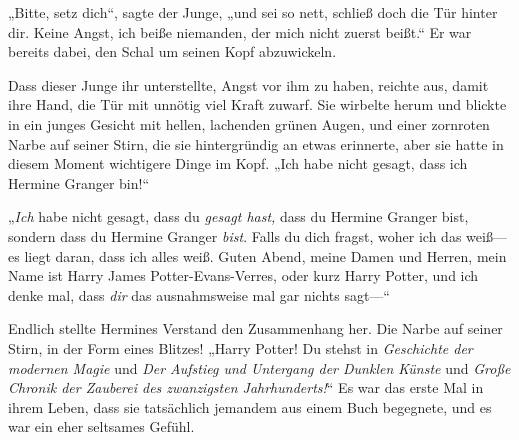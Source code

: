 „Bitte, setz dich“, sagte der Junge, „und sei so nett, schließ doch die Tür hinter dir. Keine Angst, ich beiße niemanden, der mich nicht zuerst beißt.“ Er war bereits dabei, den Schal um seinen Kopf abzuwickeln.

Dass dieser Junge ihr unterstellte, Angst vor ihm zu haben, reichte aus, damit ihre Hand, die Tür mit unnötig viel Kraft zuwarf. Sie wirbelte herum und blickte in ein junges Gesicht mit hellen, lachenden grünen Augen, und einer zornroten Narbe auf seiner Stirn, die sie hintergründig an etwas erinnerte, aber sie hatte in diesem Moment wichtigere Dinge im Kopf. „Ich habe nicht gesagt, dass ich Hermine Granger bin!“

„\emph{Ich} habe nicht gesagt, dass du \emph{gesagt hast,} dass du Hermine Granger bist, sondern dass du Hermine Granger \emph{bist}. Falls du dich fragst, woher ich das weiß—es liegt daran, dass ich alles weiß. Guten Abend, meine Damen und Herren, mein Name ist Harry James Potter-Evans-Verres, oder kurz Harry Potter, und ich denke mal, dass \emph{dir} das ausnahmsweise mal gar nichts sagt—“

Endlich stellte Hermines Verstand den Zusammenhang her. Die Narbe auf seiner Stirn, in der Form eines Blitzes! „Harry Potter! Du stehst in \emph{Geschichte der modernen Magie} und \emph{Der Aufstieg und Untergang der Dunklen Künste} und \emph{Große Chronik der Zauberei des zwanzigsten Jahrhunderts!}“ Es war das erste Mal in ihrem Leben, dass sie tatsächlich jemandem aus einem Buch begegnete, und es war ein eher seltsames Gefühl.

